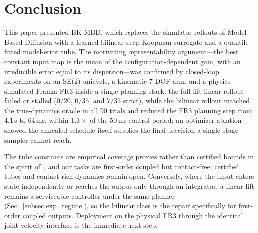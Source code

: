 \documentclass[lettersize,journal]{IEEEtran}
\theoremstyle{remark}
\newcommand{\bkmbd}{\textsc{BK-MBD}}
\begin{document}
\section{Conclusion}\label{sec:conclusion}
This paper presented \bkmbd{}, which replaces the simulator rollouts of
Model-Based Diffusion with a learned bilinear deep Koopman surrogate and
a quantile-fitted model-error tube. The motivating representability
argument---the best constant input map is the mean of the
configuration-dependent gain, with an irreducible error equal to its
dispersion---was confirmed by closed-loop experiments
on an SE(2) unicycle, a kinematic $7$-DOF arm, and a physics-simulated
Franka FR3 inside a single planning stack: the full-lift linear rollout
failed or stalled ($0/20$, $0/35$, and $7/35$ strict), while the bilinear
rollout matched the true-dynamics oracle in all $90$ trials and reduced
the FR3 planning step from $4.1$\,s to $64$\,ms, within $1.3\times$ of
the $50$\,ms control period; an optimizer ablation showed the annealed
schedule itself supplies the final precision a single-stage sampler
cannot reach.

The tube constants are empirical coverage proxies rather than certified
bounds in the spirit of~\cite{safedmd2024}, and our tasks are first-order
coupled but contact-free; certified tubes and contact-rich dynamics
remain open. Conversely, where the input enters state-independently or
reaches the output only through an integrator, a linear lift remains a
serviceable controller under the same planner
(Sec.~\ref{subsec:exp_regime}), so the bilinear class is the repair
specifically for first-order coupled outputs. Deployment on the physical
FR3 through the identical joint-velocity interface is the immediate next
step.



\end{document}
